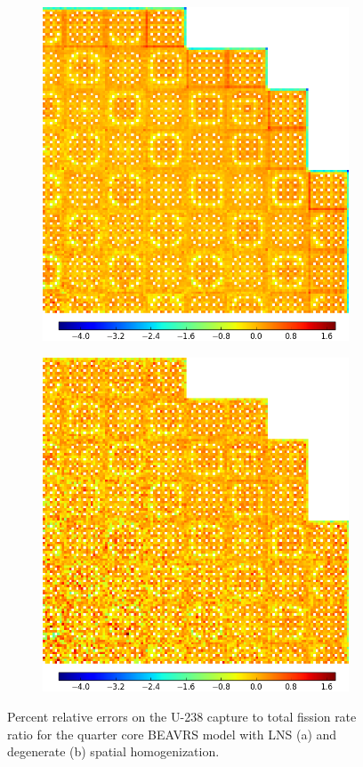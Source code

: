 \begin{figure}[h!]
\centering
\begin{subfigure}{0.9\textwidth}
  \centering
  \includegraphics[width=0.65\linewidth]{figures/results/capt-to-fiss/spatial/full-core/capt-to-fiss-err-lns}
  \caption{}
  \label{fig:chap11-full-core-capt-to-fiss-err-lns}
\end{subfigure}
\begin{subfigure}{0.9\textwidth}
  \centering
\includegraphics[width=0.65\linewidth]{figures/results/capt-to-fiss/spatial/full-core/capt-to-fiss-err-degenerate}
  \caption{}
  \label{fig:chap11-full-core-capt-to-fiss-err-degenerate}
\end{subfigure}
\caption[Capture-to-fission rate error spatial distributions]{Percent relative errors on the U-238 capture to total fission rate ratio for the quarter core \ac{BEAVRS} model with \ac{LNS} (a) and degenerate (b) spatial homogenization.}
\label{fig:chap11-full-core-capt-to-fiss-err-a}
\end{figure}

